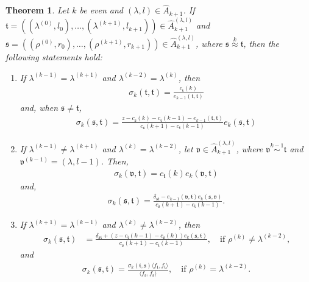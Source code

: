 \documentclass[11pt,a4paper,reqno,svgnames]{amsart}
\theoremstyle{plain}
\newtheorem{theorem}{Theorem}[section]
\theoremstyle{definition}
\numberwithin{equation}{section}
\begin{document}
\begin{theorem}\label{sigmaeven} Let $k$ be even and $(\lambda,{l})\in\hat{A}_{k+1}$. If  $\mathfrak{t}=((\lambda^{(0)},l_0),\ldots,(\lambda^{(k+1)},l_{k+1}))\in\hat{A}_{k+1}^{(\lambda,{l})}$ and  $\mathfrak{s}=((\rho^{(0)},r_0),\ldots,(\rho^{(k+1)},r_{k+1}))\in\hat{A}_{k+1}^{(\lambda,l)}$, where $\mathfrak{s}\stackrel{k}{\approx}\mathfrak{t}$, then the following statements hold:
\begin{enumerate}[label=(\arabic{*}), ref=\arabic{*},leftmargin=0pt,itemindent=1.5em]
\item\label{sigmaeven.1} If $\lambda^{(k-1)}=\lambda^{(k+1)}$  and  $\lambda^{(k-2)}=\lambda^{(k)}$, then   
\begin{align*}
\sigma_{k}(\mathfrak{t,t})=
\frac{c_\mathfrak{t}(k)}{e_{k-1}(\mathfrak{t,t})}
\end{align*}
and, when $\mathfrak{s}\ne\mathfrak{t}$,
\begin{align}\label{sigmaeven.1.1}
\sigma_{k}(\mathfrak{s},\mathfrak{t})=
\frac{z-c_\mathfrak{s}(k)-c_\mathfrak{t}(k-1)-e_{k-1}(\mathfrak{t,t})}{c_\mathfrak{s}(k+1)-c_\mathfrak{t}(k-1)}e_k(\mathfrak{s,t})
\end{align}
\item\label{sigmaeven.2} If $\lambda^{(k-1)}\ne \lambda^{(k+1)}$ and $\lambda^{(k)}=\lambda^{(k-2)}$, let $\mathfrak{v}\in\hat{A}_{k+1}^{(\lambda,l)}$, where $\mathfrak{v}\stackrel{k-1}{\sim}\mathfrak{t}$ and $\mathfrak{v}^{(k-1)}=(\lambda,l-1)$. Then, 
\begin{align}\label{sigmaeven.2.2}
\sigma_k(\mathfrak{v,t})=c_\mathfrak{t}(k)e_k(\mathfrak{v,t})
\end{align}
and, 
\begin{align}\label{sigmaeven.2.1}
\sigma_{k}(\mathfrak{s,t})=\frac{\delta_\mathfrak{st}-e_{k-1}(\mathfrak{v,t}) e_k(\mathfrak{s,v})}{c_\mathfrak{s}(k+1)-c_\mathfrak{t}(k-1)}.
\end{align}
\item\label{sigmaeven.3} If $\lambda^{(k+1)}=\lambda^{(k-1)}$ and $\lambda^{(k)}\ne\lambda^{(k-2)}$, then   
\begin{align}\label{sigmaeven.3.1}
\sigma_{k}(\mathfrak{s},\mathfrak{t})&=
\frac{\delta_\mathfrak{st}+(z-c_\mathfrak{t}(k-1)-c_\mathfrak{s}(k))e_k(\mathfrak{s,t})}{c_\mathfrak{s}(k+1)-c_\mathfrak{t}(k-1)}, \quad\text{if $\rho^{(k)}\ne \lambda^{(k-2)}$,}
\end{align}
and 
\begin{align}\label{sigmaeven.3.2}
\sigma_k(\mathfrak{s,t})=\frac{\sigma_k(\mathfrak{t,s})\langle f_\mathfrak{t},f_\mathfrak{t}\rangle}{\langle f_\mathfrak{s},f_\mathfrak{s}\rangle},\quad\text{if $\rho^{(k)}=\lambda^{(k-2)}$.}

\end{align}
\end{enumerate}
\end{theorem}
\end{document}
